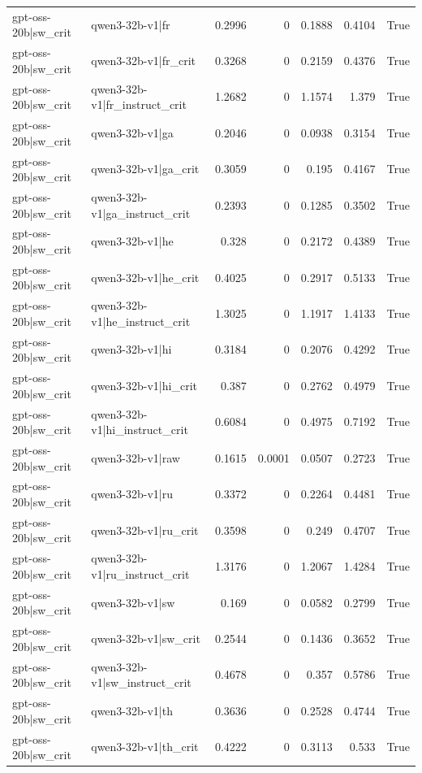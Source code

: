 \begin{table}
\begin{tabular}{l l r r r r l}
gpt-oss-20b|sw_crit & qwen3-32b-v1|fr & 0.2996 & 0 & 0.1888 & 0.4104 & True \\
gpt-oss-20b|sw_crit & qwen3-32b-v1|fr_crit & 0.3268 & 0 & 0.2159 & 0.4376 & True \\
gpt-oss-20b|sw_crit & qwen3-32b-v1|fr_instruct_crit & 1.2682 & 0 & 1.1574 & 1.379 & True \\
gpt-oss-20b|sw_crit & qwen3-32b-v1|ga & 0.2046 & 0 & 0.0938 & 0.3154 & True \\
gpt-oss-20b|sw_crit & qwen3-32b-v1|ga_crit & 0.3059 & 0 & 0.195 & 0.4167 & True \\
gpt-oss-20b|sw_crit & qwen3-32b-v1|ga_instruct_crit & 0.2393 & 0 & 0.1285 & 0.3502 & True \\
gpt-oss-20b|sw_crit & qwen3-32b-v1|he & 0.328 & 0 & 0.2172 & 0.4389 & True \\
gpt-oss-20b|sw_crit & qwen3-32b-v1|he_crit & 0.4025 & 0 & 0.2917 & 0.5133 & True \\
gpt-oss-20b|sw_crit & qwen3-32b-v1|he_instruct_crit & 1.3025 & 0 & 1.1917 & 1.4133 & True \\
gpt-oss-20b|sw_crit & qwen3-32b-v1|hi & 0.3184 & 0 & 0.2076 & 0.4292 & True \\
gpt-oss-20b|sw_crit & qwen3-32b-v1|hi_crit & 0.387 & 0 & 0.2762 & 0.4979 & True \\
gpt-oss-20b|sw_crit & qwen3-32b-v1|hi_instruct_crit & 0.6084 & 0 & 0.4975 & 0.7192 & True \\
gpt-oss-20b|sw_crit & qwen3-32b-v1|raw & 0.1615 & 0.0001 & 0.0507 & 0.2723 & True \\
gpt-oss-20b|sw_crit & qwen3-32b-v1|ru & 0.3372 & 0 & 0.2264 & 0.4481 & True \\
gpt-oss-20b|sw_crit & qwen3-32b-v1|ru_crit & 0.3598 & 0 & 0.249 & 0.4707 & True \\
gpt-oss-20b|sw_crit & qwen3-32b-v1|ru_instruct_crit & 1.3176 & 0 & 1.2067 & 1.4284 & True \\
gpt-oss-20b|sw_crit & qwen3-32b-v1|sw & 0.169 & 0 & 0.0582 & 0.2799 & True \\
gpt-oss-20b|sw_crit & qwen3-32b-v1|sw_crit & 0.2544 & 0 & 0.1436 & 0.3652 & True \\
gpt-oss-20b|sw_crit & qwen3-32b-v1|sw_instruct_crit & 0.4678 & 0 & 0.357 & 0.5786 & True \\
gpt-oss-20b|sw_crit & qwen3-32b-v1|th & 0.3636 & 0 & 0.2528 & 0.4744 & True \\
gpt-oss-20b|sw_crit & qwen3-32b-v1|th_crit & 0.4222 & 0 & 0.3113 & 0.533 & True \\

\end{tabular}
\end{table}
